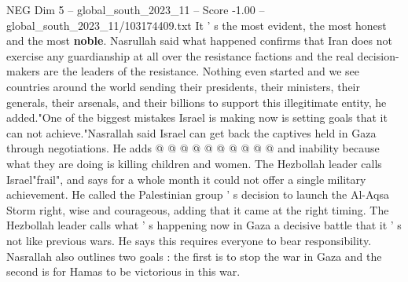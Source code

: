 \begin{textsample}{NEG Dim 5 – global\_south\_2023\_11 – Score -1.00 – global\_south\_2023\_11/103174409.txt}
It ' s the most evident, the most honest and the most \textbf{noble}.
Nasrullah said what happened confirms that Iran does not exercise any guardianship at all over the resistance factions and the real decision-makers are the leaders of the resistance.
Nothing even started and we see countries around the world sending their presidents, their ministers, their generals, their arsenals, and their billions to support this illegitimate entity, he added."One of the biggest mistakes Israel is making now is setting goals that it can not achieve."Nasrallah said Israel can get back the captives held in Gaza through negotiations.
He adds @ @ @ @ @ @ @ @ @ @ and inability because what they are doing is killing children and women.
The Hezbollah leader calls Israel"frail", and says for a whole month it could not offer a single military achievement.
He called the Palestinian group ' s decision to launch the Al-Aqsa Storm right, wise and courageous, adding that it came at the right timing.
The Hezbollah leader calls what ' s happening now in Gaza a decisive battle that it ' s not like previous wars.
He says this requires everyone to bear responsibility.
Nasrallah also outlines two goals : the first is to stop the war in Gaza and the second is for Hamas to be victorious in this war.

\end{textsample}
